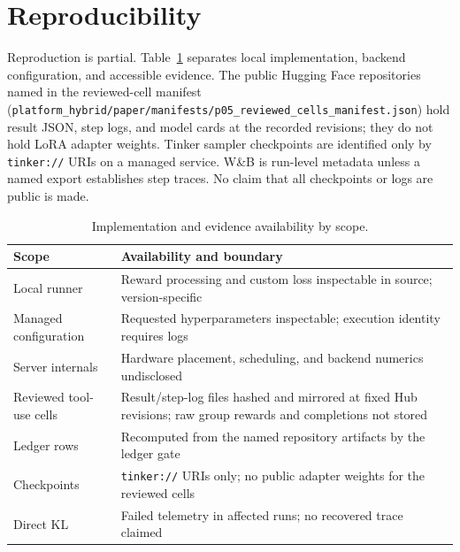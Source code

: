 \documentclass{article}
\begin{document}
\section{Reproducibility}
\label{sec:reproducibility}

Reproduction is partial. Table~\ref{tab:availability-audit} separates local
implementation, backend configuration, and accessible evidence. The public
Hugging Face repositories named in the reviewed-cell manifest
(\texttt{platform\_hybrid/paper/manifests/p05\_reviewed\_cells\_manifest.json})
hold result JSON, step logs, and model cards at the recorded revisions; they do
not hold LoRA adapter weights. Tinker sampler checkpoints are identified only by
\texttt{tinker://} URIs on a managed service. W\&B is run-level metadata unless
a named export establishes step traces. No claim that all checkpoints or logs
are public is made.

\begin{table}[htbp]
\centering\small
\caption{Implementation and evidence availability by scope.}
\label{tab:availability-audit}
\begin{tabular}{p{.28\linewidth}p{.62\linewidth}}
\toprule
Scope & Availability and boundary \\
\midrule
Local runner & Reward processing and custom loss inspectable in source; version-specific \\
Managed configuration & Requested hyperparameters inspectable; execution identity requires logs \\
Server internals & Hardware placement, scheduling, and backend numerics undisclosed \\
Reviewed tool-use cells & Result/step-log files hashed and mirrored at fixed Hub revisions; raw group rewards and completions not stored \\
Ledger rows & Recomputed from the named repository artifacts by the ledger gate \\
Checkpoints & \texttt{tinker://} URIs only; no public adapter weights for the reviewed cells \\
Direct KL & Failed telemetry in affected runs; no recovered trace claimed \\
\bottomrule
\end{tabular}
\end{table}

\end{document}
